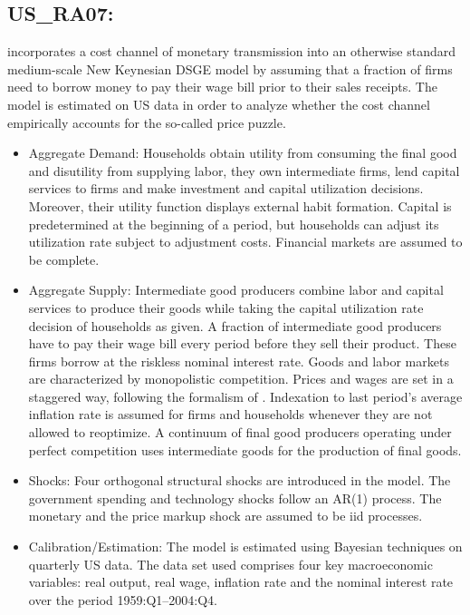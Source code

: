 \documentclass[11pt,a4paper]{article}
\begin{document}
	
	\subsection{US\_RA07: \cite{Rabanal2007}}
	\label{USRA07}
	\cite{Rabanal2007} incorporates a cost channel of monetary transmission into an otherwise standard medium-scale New Keynesian DSGE model by assuming that a fraction of firms need to borrow money to pay their wage bill prior to their sales receipts. The model is estimated on US data in order to analyze whether the cost channel empirically accounts for the so-called price puzzle.
	
	\begin{itemize}
		
		\item Aggregate Demand: Households obtain utility from consuming the final good and disutility from supplying labor, they own intermediate firms, lend capital services to firms and make investment and capital utilization decisions. Moreover, their utility function displays external habit formation. Capital is predetermined at the beginning of a period, but households can adjust its utilization rate subject to adjustment costs. Financial markets are assumed to be complete.
		
		\item Aggregate Supply: Intermediate good producers combine labor and capital services to produce their goods while taking the capital utilization rate decision of households as given. A fraction of intermediate good producers have to pay their wage bill every period before they sell their product. These firms borrow at the riskless nominal interest rate. Goods and labor markets are characterized by monopolistic competition. Prices and wages are set in a staggered way, following the formalism of \cite{Calvo1983}. Indexation to last period's average inflation rate is assumed for firms and households whenever they are not allowed to reoptimize. A continuum of final good producers operating under perfect competition uses intermediate goods for the production of final goods.
		
		\item Shocks: Four orthogonal structural shocks are introduced in the model. The government spending and technology shocks follow an AR(1) process. The monetary and the price markup shock are assumed to be iid processes.
		
		\item Calibration/Estimation: The model is estimated using Bayesian techniques on quarterly US data. The data set used comprises four key macroeconomic variables: real output, real wage, inflation rate and the nominal interest rate over the period 1959:Q1--2004:Q4.
		
		
		
	\end{itemize}
	
\end{document}
